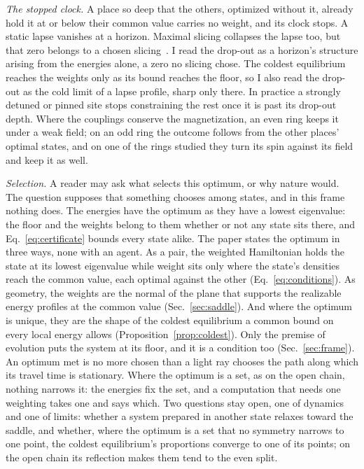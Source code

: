 \documentclass[aps,prd,reprint,superscriptaddress]{revtex4-2}
\begin{document}
\emph{The stopped clock.} A place so deep that the others, optimized without it, already hold it at or below their common value carries no weight, and its clock stops. A static lapse vanishes at a horizon. Maximal slicing collapses the lapse too, but that zero belongs to a chosen slicing~\cite{EstabrookEtAl1973}. I read the drop-out as a horizon's structure arising from the energies alone, a zero no slicing chose. The coldest equilibrium reaches the weights only as its bound reaches the floor, so I also read the drop-out as the cold limit of a lapse profile, sharp only there. In practice a strongly detuned or pinned site stops constraining the rest once it is past its drop-out depth. Where the couplings conserve the magnetization, an even ring keeps it under a weak field; on an odd ring the outcome follows from the other places' optimal states, and on one of the rings studied they turn its spin against its field and keep it as well.

\emph{Selection.} A reader may ask what selects this optimum, or why nature would. The question supposes that something chooses among states, and in this frame nothing does. The energies have the optimum as they have a lowest eigenvalue: the floor and the weights belong to them whether or not any state sits there, and Eq.~\eqref{eq:certificate} bounds every state alike. The paper states the optimum in three ways, none with an agent. As a pair, the weighted Hamiltonian holds the state at its lowest eigenvalue while weight sits only where the state's densities reach the common value, each optimal against the other (Eq.~\eqref{eq:conditions}). As geometry, the weights are the normal of the plane that supports the realizable energy profiles at the common value (Sec.~\ref{sec:saddle}). And where the optimum is unique, they are the shape of the coldest equilibrium a common bound on every local energy allows (Proposition~\ref{prop:coldest}). Only the premise of evolution puts the system at its floor, and it is a condition too (Sec.~\ref{sec:frame}). An optimum met is no more chosen than a light ray chooses the path along which its travel time is stationary. Where the optimum is a set, as on the open chain, nothing narrows it: the energies fix the set, and a computation that needs one weighting takes one and says which. Two questions stay open, one of dynamics and one of limits: whether a system prepared in another state relaxes toward the saddle, and whether, where the optimum is a set that no symmetry narrows to one point, the coldest equilibrium's proportions converge to one of its points; on the open chain its reflection makes them tend to the even split.
\end{document}
